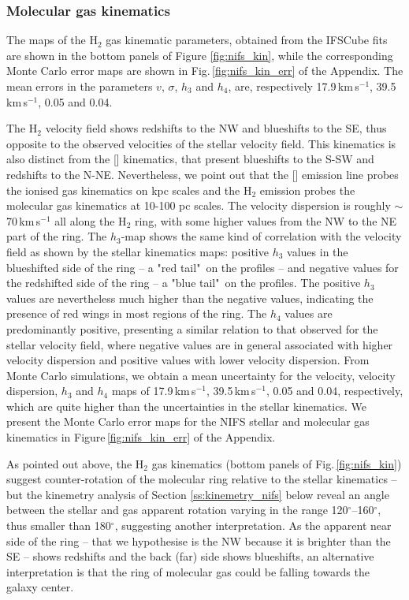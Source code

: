\documentclass[fleqn,usenatbib]{mnras}
\begin{document}
\subsubsection{Molecular gas kinematics}


The maps of the H$_2$ gas kinematic parameters, obtained from the IFSCube fits are shown in the bottom panels of Figure \ref{fig:nifs_kin}, while the corresponding Monte Carlo error maps are shown in Fig.\,\ref{fig:nifs_kin_err} of the Appendix. The mean errors in the parameters $v$, $\sigma$, $h_3$ and $h_4$, are, respectively 17.9\,km\,s$^{-1}$, 39.5\,km\,s$^{-1}$, 0.05 and 0.04.

The H$_2$ velocity field shows redshifts to the NW and blueshifts to the SE, thus opposite to the observed velocities of the stellar velocity field. This kinematics is also distinct from the [] kinematics, that present blueshifts to the S-SW and redshifts to the N-NE. Nevertheless, we point out that the [] emission line probes the ionised gas kinematics on kpc scales and the H$_2$ emission probes the molecular gas kinematics at 10-100 pc scales. The velocity dispersion is roughly $\sim$70\,km\,s$^{-1}$ all along the H$_2$ ring, with some higher values from the NW to the NE part of the ring. The $h_3$-map shows the same kind of correlation with the velocity field as shown by the stellar kinematics maps: positive $h_3$ values in the blueshifted side of the ring -- a "red tail"\, on the profiles -- and negative values for the redshifted side of the ring --  a "blue tail"\, on the profiles. The positive $h_3$ values are nevertheless much higher than the negative values, indicating the presence of red wings in most regions of the ring. The $h_4$ values are predominantly positive, presenting a similar relation to that observed for the stellar velocity field, where negative values are in general associated with higher velocity dispersion and positive values with lower velocity dispersion. From Monte Carlo simulations, we obtain a mean uncertainty for the velocity, velocity dispersion, $h_3$ and $h_4$ maps of 17.9\,km\,s$^{-1}$, 39.5\,km\,s$^{-1}$, 0.05 and 0.04, respectively, which are quite higher than the uncertainties in the stellar kinematics. We present the Monte Carlo error maps for the NIFS stellar and molecular gas kinematics in Figure\,\ref{fig:nifs_kin_err} of the Appendix.

As pointed out above, the H$_2$ gas kinematics (bottom panels of Fig.\,\ref{fig:nifs_kin}) suggest counter-rotation of the molecular ring relative to the stellar kinematics  -- but the kinemetry analysis of Section \ref{ss:kinemetry_nifs} below reveal an angle between the stellar and gas apparent rotation varying in the range 120$^{\circ}$--160$^{\circ}$, thus smaller than 180$^{\circ}$, suggesting another interpretation. As the apparent near side of the ring -- that we hypothesise is the NW because it is brighter than the SE -- shows redshifts and the back (far) side shows blueshifts, an alternative interpretation is that the ring of molecular gas could be falling towards the galaxy center.
\end{document}
